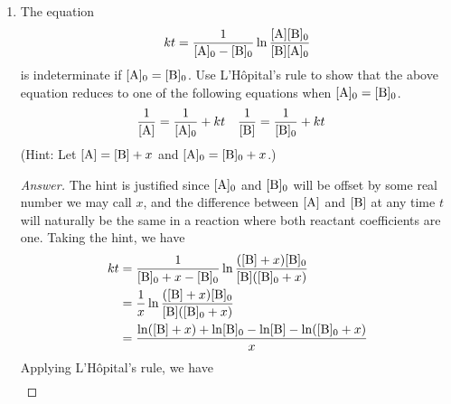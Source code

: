 \documentclass[../psets.tex]{subfiles}
\begin{document}
\begin{enumerate}[label={\textbf{28-\arabic*.}},leftmargin=3.5em]
\begin{proof}[Answer]
\begin{align*}
            &= -\frac{1}{[\ce{B}]_0-[\ce{A}]_0}\int_{[\ce{A}]_0}^{[\ce{A}]}\left( \frac{\dd{[\ce{A}]}}{[\ce{A}]}-\frac{\dd{[\ce{A}]}}{[\ce{B}]_0-[\ce{A}]_0+[\ce{A}]} \right)\\
            kt &= \frac{1}{[\ce{A}]_0-[\ce{B}]_0}\left( \ln\frac{[\ce{A}]}{[\ce{A}]_0}-\ln\frac{[\ce{B}]_0-[\ce{A}]_0+[\ce{A}]}{[\ce{B}]_0-[\ce{A}]_0+[\ce{A}]_0} \right)\\
            &= \frac{1}{[\ce{A}]_0-[\ce{B}]_0}\left( \ln\frac{[\ce{A}]}{[\ce{A}]_0}-\ln\frac{[\ce{B}]}{[\ce{B}]_0} \right)\\
            &= \frac{1}{[\ce{A}]_0-[\ce{B}]_0}\ln\frac{[\ce{A}][\ce{B}]_0}{[\ce{B}][\ce{A}]_0}
        \end{align*}
        as desired, where we have used the method of partial fractions to enable integration.
    \end{proof}
    \item The equation
    \begin{equation*}
        kt = \frac{1}{[\ce{A}]_0-[\ce{B}]_0}\ln\frac{[\ce{A}][\ce{B}]_0}{[\ce{B}][\ce{A}]_0}
    \end{equation*}
    is indeterminate if $[\ce{A}]_0=[\ce{B}]_0$. Use L'H\^{o}pital's rule to show that the above equation reduces to one of the following equations when $[\ce{A}]_0=[\ce{B}]_0$.
    \begin{align*}
        \frac{1}{[\ce{A}]} &= \frac{1}{[\ce{A}]_0}+kt&
        \frac{1}{[\ce{B}]} &= \frac{1}{[\ce{B}]_0}+kt
    \end{align*}
    (Hint: Let $[\ce{A}]=[\ce{B}]+x$ and $[\ce{A}]_0=[\ce{B}]_0+x$.)
    \begin{proof}[Answer]
        The hint is justified since $[\ce{A}]_0$ and $[\ce{B}]_0$ will be offset by some real number we may call $x$, and the difference between $[\ce{A}]$ and $[\ce{B}]$ at any time $t$ will naturally be the same in a reaction where both reactant coefficients are one. Taking the hint, we have
        \begin{align*}
            kt &= \frac{1}{[\ce{B}]_0+x-[\ce{B}]_0}\ln\frac{([\ce{B}]+x)[\ce{B}]_0}{[\ce{B}]([\ce{B}]_0+x)}\\
            &= \frac{1}{x}\ln\frac{([\ce{B}]+x)[\ce{B}]_0}{[\ce{B}]([\ce{B}]_0+x)}\\
            &= \frac{\ln([\ce{B}]+x)+\ln[\ce{B}]_0-\ln[\ce{B}]-\ln([\ce{B}]_0+x)}{x}
        \end{align*}
        Applying L'H\^{o}pital's rule, we have
        \begin{align*}

\end{align*}
\end{proof}
\end{enumerate}
\end{document}
